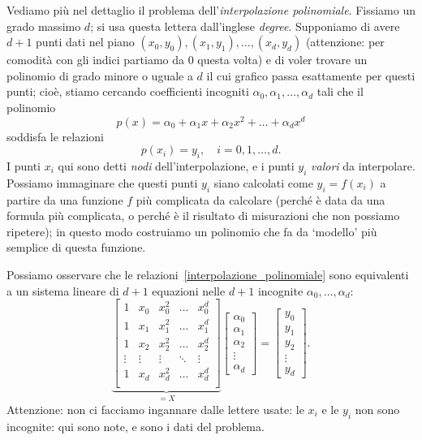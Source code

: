 \documentclass[a4paper]{report}
\theoremstyle{definiton}
\theoremstyle{remark}
\begin{document}
Vediamo più nel dettaglio il problema dell'\emph{interpolazione polinomiale}. Fissiamo un grado massimo $d$; si usa questa lettera dall'inglese \emph{degree}. Supponiamo di avere $d+1$ punti dati nel piano $(x_0, y_0), (x_1, y_1), \dots, (x_{d}, y_{d})$ (attenzione: per comodità con gli indici partiamo da $0$ questa volta) e di voler trovare un polinomio di grado minore o uguale a $d$ il cui grafico passa esattamente per questi punti; cioè, stiamo cercando coefficienti incogniti $\alpha_0, \alpha_1, \dots, \alpha_d$ tali che il polinomio
\[
p(x) = \alpha_0 + \alpha_1 x + \alpha_2 x^2 + \dots + \alpha_d x^d
\]
soddisfa le relazioni
\begin{equation} \label{interpolazione_polinomiale}
p(x_i) = y_i, \quad i=0,1,\dots,d.
\end{equation}
I punti $x_i$ qui sono detti \emph{nodi} dell'interpolazione, e i punti $y_i$ \emph{valori} da interpolare. Possiamo immaginare che questi punti $y_i$ siano calcolati come $y_i = f(x_i)$ a partire da una funzione $f$ più complicata da calcolare (perché è data da una formula più complicata, o perché è il risultato di misurazioni che non possiamo ripetere); in questo modo costruiamo un polinomio che fa da `modello' più semplice di questa funzione.

Possiamo osservare che le relazioni~\eqref{interpolazione_polinomiale} sono equivalenti a un sistema lineare di $d+1$ equazioni nelle $d+1$ incognite $\alpha_0,\dots,\alpha_d$:
\[
\underbrace{
\begin{bmatrix}
    1 & x_0 & x_0^2 & \dots & x_0^{d}\\
    1 & x_1 & x_1^2 & \dots & x_1^{d}\\
    1 & x_2 & x_2^2 & \dots & x_2^{d}\\
    \vdots & \vdots & \vdots & \ddots & \vdots\\
    1 & x_d & x_d^2 & \dots & x_d^{d}\\
\end{bmatrix}
}_{=X}
\begin{bmatrix}
    \alpha_0 \\ \alpha_1 \\ \alpha_2 \\ \vdots \\ \alpha_d
\end{bmatrix}=
\begin{bmatrix}
    y_0 \\ y_1 \\ y_2 \\ \vdots \\ y_d
\end{bmatrix}.
\]
Attenzione: non ci facciamo ingannare dalle lettere usate: le $x_i$ e le $y_i$ non sono incognite: qui sono note, e sono i dati del problema.
\end{document}
